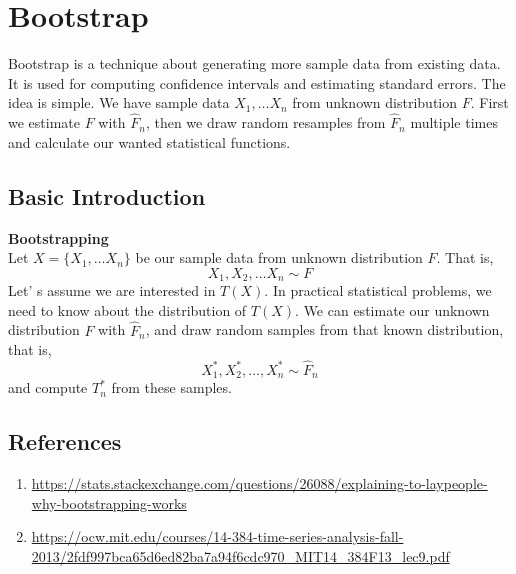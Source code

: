 \chapter{Bootstrap}
Bootstrap is a technique about generating more sample data from existing data. It is used for computing confidence intervals and estimating standard errors. The idea is simple. We have sample data $X_1, \ldots X_n$ from unknown distribution $F$. First we estimate $F$ with $\widehat{F}_n$, then we draw random resamples from $\widehat{F}_n$ multiple times and calculate our wanted statistical functions.
\section{Basic Introduction}
\begin{definition}\textbf{Bootstrapping}\\
    Let $X = \{X_1, \ldots X_n \}$ be our sample data from unknown distribution $F$. That is,
    \[X_1,X_2, \ldots X_n \sim F \]
    Let' s assume we are interested in $T(X)$. In practical statistical problems, we need to know about the distribution of $T(X)$. We can estimate our unknown distribution $F$ with $\widehat{F}_n$, and draw random samples from that known distribution, that is,
    \[X^*_1, X^*_2, \ldots, X^*_n  \sim \widehat{F}_n\]
    and compute $T^*_n$ from these samples.
\end{definition}
\section{References}
\begin{enumerate}
    \item \url{https://stats.stackexchange.com/questions/26088/explaining-to-laypeople-why-bootstrapping-works}
    \item \url{https://ocw.mit.edu/courses/14-384-time-series-analysis-fall-2013/2fdf997bca65d6ed82ba7a94f6cdc970_MIT14_384F13_lec9.pdf}
\end{enumerate}

